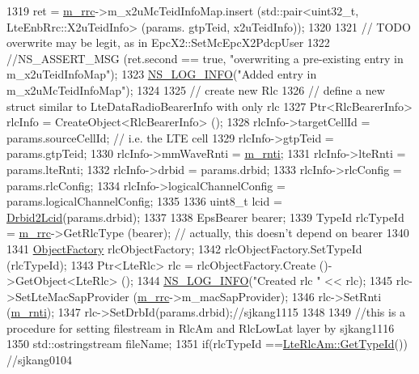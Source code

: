 \begin{DoxyCode}
1319     ret = \hyperlink{classns3_1_1UeManager_ab4405e9f354c66e7c1a4c95832290f5b}{m\_rrc}->m\_x2uMcTeidInfoMap.insert (std::pair<uint32\_t, LteEnbRrc::X2uTeidInfo> (params.
      gtpTeid, x2uTeidInfo));
1320 
1321     \textcolor{comment}{// TODO overwrite may be legit, as in EpcX2::SetMcEpcX2PdcpUser}
1322     \textcolor{comment}{//NS\_ASSERT\_MSG (ret.second == true, "overwriting a pre-existing entry in m\_x2uTeidInfoMap");}
1323     \hyperlink{group__logging_gafbd73ee2cf9f26b319f49086d8e860fb}{NS\_LOG\_INFO}(\textcolor{stringliteral}{"Added entry in m\_x2uMcTeidInfoMap"});
1324     
1325     \textcolor{comment}{// create new Rlc}
1326     \textcolor{comment}{// define a new struct similar to LteDataRadioBearerInfo with only rlc}
1327     Ptr<RlcBearerInfo> rlcInfo = CreateObject<RlcBearerInfo> ();
1328     rlcInfo->targetCellId = params.sourceCellId; \textcolor{comment}{// i.e. the LTE cell}
1329     rlcInfo->gtpTeid = params.gtpTeid;
1330     rlcInfo->mmWaveRnti = \hyperlink{classns3_1_1UeManager_a5a72b4fe818f21993bd7f05d7e2c4f83}{m\_rnti};
1331     rlcInfo->lteRnti = params.lteRnti;
1332     rlcInfo->drbid = params.drbid;
1333     rlcInfo->rlcConfig = params.rlcConfig;
1334     rlcInfo->logicalChannelConfig = params.logicalChannelConfig;
1335 
1336     uint8\_t lcid = \hyperlink{classns3_1_1UeManager_af0ba90c3b4fe3300796ffc03de328f73}{Drbid2Lcid}(params.drbid);
1337 
1338     EpsBearer bearer;
1339     TypeId rlcTypeId = \hyperlink{classns3_1_1UeManager_ab4405e9f354c66e7c1a4c95832290f5b}{m\_rrc}->GetRlcType (bearer); \textcolor{comment}{// actually, this doesn't depend on bearer}
1340 
1341     \hyperlink{classns3_1_1Object_a2810e70b8c8377aa8617138fc0f65e92}{ObjectFactory} rlcObjectFactory;
1342     rlcObjectFactory.SetTypeId (rlcTypeId);
1343     Ptr<LteRlc> rlc = rlcObjectFactory.Create ()->GetObject<LteRlc> ();
1344     \hyperlink{group__logging_gafbd73ee2cf9f26b319f49086d8e860fb}{NS\_LOG\_INFO}(\textcolor{stringliteral}{"Created rlc "} << rlc);
1345     rlc->SetLteMacSapProvider (\hyperlink{classns3_1_1UeManager_ab4405e9f354c66e7c1a4c95832290f5b}{m\_rrc}->m\_macSapProvider);
1346     rlc->SetRnti (\hyperlink{classns3_1_1UeManager_a5a72b4fe818f21993bd7f05d7e2c4f83}{m\_rnti});
1347     rlc->SetDrbId(params.drbid);\textcolor{comment}{//sjkang1115}
1348 
1349                                 \textcolor{comment}{//this is a procedure for setting filestream in RlcAm and RlcLowLat layer 
       by sjkang1116}
1350                                 std::ostringstream fileName;
1351                                 \textcolor{keywordflow}{if}(rlcTypeId ==\hyperlink{classns3_1_1LteRlcAm_a28143176a465769583d9db0b4b36b91b}{LteRlcAm::GetTypeId}())  \textcolor{comment}{//sjkang0104}

\end{DoxyCode}
